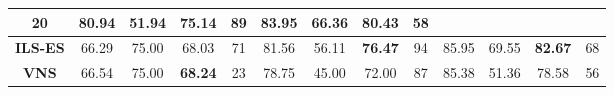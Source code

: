 \begin{table}[H]
{\begin{tabular}{c|cccc|cccc|cccc|}
			20 &
			\multicolumn{1}{c|}{80.94} &
			\multicolumn{1}{c|}{51.94} &
			\multicolumn{1}{c|}{75.14} &
			89 &
			\multicolumn{1}{c|}{83.95} &
			\multicolumn{1}{c|}{66.36} &
			\multicolumn{1}{c|}{80.43} &
			58 \\ \hline
			\multicolumn{1}{|c|}{{\color[HTML]{FE0000} \textbf{ILS-ES}}} &
			\multicolumn{1}{c|}{66.29} &
			\multicolumn{1}{c|}{75.00} &
			\multicolumn{1}{c|}{68.03} &
			71 &
			\multicolumn{1}{c|}{81.56} &
			\multicolumn{1}{c|}{56.11} &
			\multicolumn{1}{c|}{{\color[HTML]{00009B} \textbf{76.47}}} &
			94 &
			\multicolumn{1}{c|}{85.95} &
			\multicolumn{1}{c|}{69.55} &
			\multicolumn{1}{c|}{{\color[HTML]{00009B} \textbf{82.67}}} &
			68 \\ \hline
			\multicolumn{1}{|c|}{\textbf{VNS}} &
			\multicolumn{1}{c|}{66.54} &
			\multicolumn{1}{c|}{75.00} &
			\multicolumn{1}{c|}{{\color[HTML]{00009B} \textbf{68.24}}} &
			23 &
			\multicolumn{1}{c|}{78.75} &
			\multicolumn{1}{c|}{45.00} &
			\multicolumn{1}{c|}{72.00} &
			87 &
			\multicolumn{1}{c|}{85.38} &
			\multicolumn{1}{c|}{51.36} &
			\multicolumn{1}{c|}{78.58} &
			56 \\ \hline
		\end{tabular}%
	}
\end{table}